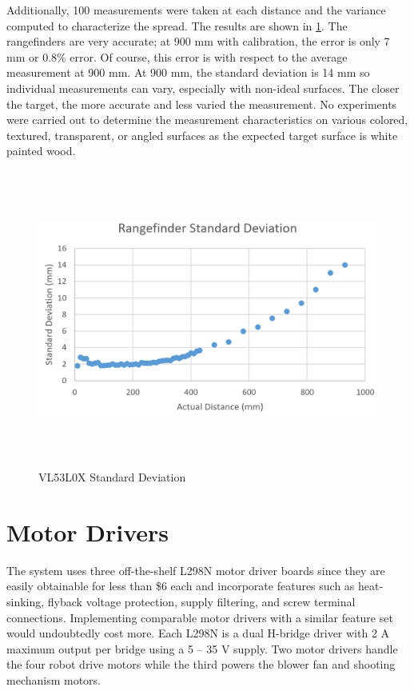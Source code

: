 Additionally, 100 measurements were taken at each distance and the variance computed to characterize the spread. The results are shown in \ref{fig:rangefinder_stddev}. The rangefinders are very accurate; at 900 mm with calibration, the error is only 7 mm or 0.8\% error. Of course, this error is with respect to the average measurement at 900 mm. At 900 mm, the standard deviation is 14 mm so individual measurements can vary, especially with non-ideal surfaces. The closer the target, the more accurate and less varied the measurement. No experiments were carried out to determine the measurement characteristics on various colored, textured, transparent, or angled surfaces as the expected target surface is white painted wood.

\begin{figure}[H]   %
	\centering \includegraphics[width=6in, height=3.85in, keepaspectratio]{figures/rangefinder_stddev.png}
	\caption{VL53L0X Standard Deviation}\label{fig:rangefinder_stddev}
\end{figure}

\section{Motor Drivers}
The system uses three off-the-shelf L298N motor driver boards since they are easily obtainable for less than \$6 each and incorporate features such as heat-sinking, flyback voltage protection, supply filtering, and screw terminal connections. Implementing comparable motor drivers with a similar feature set would undoubtedly cost more. Each L298N is a dual H-bridge driver with 2 A maximum output per bridge using a 5 -- 35 V supply. Two motor drivers handle the four robot drive motors while the third powers the blower fan and shooting mechanism motors. 

